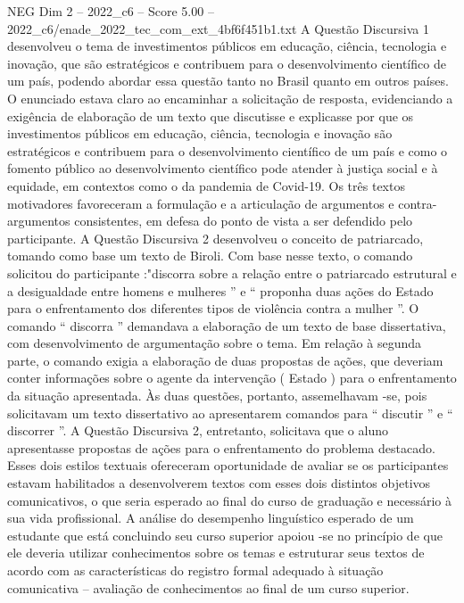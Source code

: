 \begin{textsample}{NEG Dim 2 – 2022\_c6 – Score 5.00 – 2022\_c6/enade\_2022\_tec\_com\_ext\_4bf6f451b1.txt}
A Questão Discursiva 1 desenvolveu o tema de investimentos públicos em educação, ciência, tecnologia e inovação, que são estratégicos e contribuem para o desenvolvimento científico de um país, podendo abordar essa questão tanto no Brasil quanto em outros países.
O enunciado estava claro ao encaminhar a solicitação de resposta, evidenciando a exigência de elaboração de um texto que discutisse e explicasse por que os investimentos públicos em educação, ciência, tecnologia e inovação são estratégicos e contribuem para o desenvolvimento científico de um país e como o fomento público ao desenvolvimento científico pode atender à justiça social e à equidade, em contextos como o da pandemia de Covid-19.
Os três textos motivadores favoreceram a formulação e a articulação de argumentos e contra-argumentos consistentes, em defesa do ponto de vista a ser defendido pelo participante.
A Questão Discursiva 2 desenvolveu o conceito de patriarcado, tomando como base um texto de Biroli.
Com base nesse texto, o comando solicitou do participante :"discorra sobre a relação entre o patriarcado estrutural e a desigualdade entre homens e mulheres ” e “ proponha duas ações do Estado para o enfrentamento dos diferentes tipos de violência contra a mulher ”.
O comando “ discorra ” demandava a elaboração de um texto de base dissertativa, com desenvolvimento de argumentação sobre o tema.
Em relação à segunda parte, o comando exigia a elaboração de duas propostas de ações, que deveriam conter informações sobre o agente da intervenção ( Estado ) para o enfrentamento da situação apresentada.
Às duas questões, portanto, assemelhavam -se, pois solicitavam um texto dissertativo ao apresentarem comandos para “ discutir ” e “ discorrer ”.
A Questão Discursiva 2, entretanto, solicitava que o aluno apresentasse propostas de ações para o enfrentamento do problema destacado.
Esses dois estilos textuais ofereceram oportunidade de avaliar se os participantes estavam habilitados a desenvolverem textos com esses dois distintos objetivos comunicativos, o que seria esperado ao final do curso de graduação e necessário à sua vida profissional.
A análise do desempenho linguístico esperado de um estudante que está concluindo seu curso superior apoiou -se no princípio de que ele deveria utilizar conhecimentos sobre os temas e estruturar seus textos de acordo com as características do registro formal adequado à situação comunicativa – avaliação de conhecimentos ao final de um curso superior.

\end{textsample}
